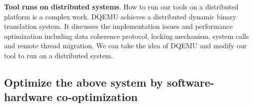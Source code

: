 \textbf{Tool runs on distributed systems}.
How to run our tools on a distributed platform is a complex work.
DQEMU \cite{Zhao2020DQEMUAS} achieves a distributed dynamic binary translation system.
It discusses the implementation issues and performance optimization including
data coherence protocol, locking mechanism, system calls and remote thread migration.
We can take the idea of DQEMU and modify our tool to run on a distributed system.

\subsection{Optimize the above system by software-hardware co-optimization}

